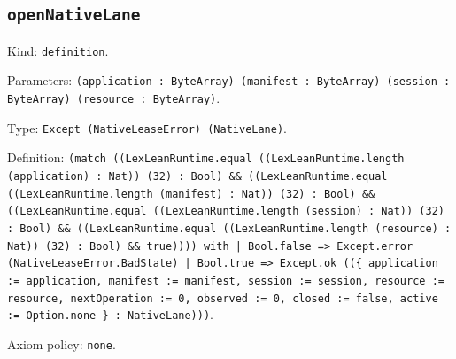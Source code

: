 \documentclass[11pt]{article}
\begin{document}
\subsection*{\texttt{openNativeLane}}
\noindent Kind: \texttt{definition}.\par
\noindent Parameters: \texttt{(application : ByteArray) (manifest : ByteArray) (session : ByteArray) (resource : ByteArray)}.\par
\noindent Type: \texttt{Except (NativeLeaseError) (NativeLane)}.\par
\noindent Definition: \texttt{(match ((LexLeanRuntime.equal ((LexLeanRuntime.length (application) : Nat)) (32) : Bool) \&\& ((LexLeanRuntime.equal ((LexLeanRuntime.length (manifest) : Nat)) (32) : Bool) \&\& ((LexLeanRuntime.equal ((LexLeanRuntime.length (session) : Nat)) (32) : Bool) \&\& ((LexLeanRuntime.equal ((LexLeanRuntime.length (resource) : Nat)) (32) : Bool) \&\& true)))) with | Bool.false => Except.error (NativeLeaseError.BadState) | Bool.true => Except.ok ((\{ application := application, manifest := manifest, session := session, resource := resource, nextOperation := 0, observed := 0, closed := false, active := Option.none \} : NativeLane)))}.\par
\noindent Axiom policy: \texttt{none}.\par
\end{document}
